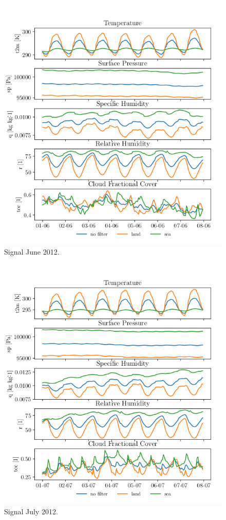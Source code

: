 \begin{figure}[ht]
    \centering
    \includegraphics{python_figs/spatially_averaged_one_week_from_2012-06-01.png}
    \caption{Signal June 2012.}
    \label{fig:jun12}
\end{figure}

\begin{figure}[ht]
    \centering
    \includegraphics{python_figs/spatially_averaged_one_week_from_2012-07-01.png}
    \caption{Signal July 2012.}
    \label{fig:jul12}
\end{figure}


